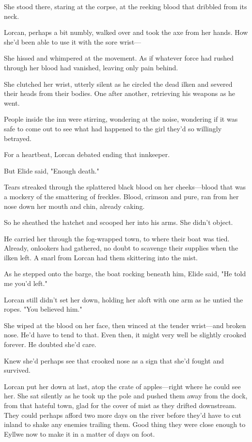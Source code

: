 She stood there, staring at the corpse, at the reeking blood that dribbled from its neck.

Lorcan, perhaps a bit numbly, walked over and took the axe from her hands. How she'd been able to use it with the sore wrist---

She hissed and whimpered at the movement. As if whatever force had rushed through her blood had vanished, leaving only pain behind.

She clutched her wrist, utterly silent as he circled the dead ilken and severed their heads from their bodies. One after another, retrieving his weapons as he went.

People inside the inn were stirring, wondering at the noise, wondering if it was safe to come out to see what had happened to the girl they'd so willingly betrayed.

For a heartbeat, Lorcan debated ending that innkeeper.

But Elide said, "Enough death."

Tears streaked through the splattered black blood on her cheeks---blood that was a mockery of the smattering of freckles. Blood, crimson and pure, ran from her nose down her mouth and chin, already caking.

So he sheathed the hatchet and scooped her into his arms. She didn't object.

He carried her through the fog-wrapped town, to where their boat was tied. Already, onlookers had gathered, no doubt to scavenge their supplies when the ilken left. A snarl from Lorcan had them skittering into the mist.

As he stepped onto the barge, the boat rocking beneath him, Elide said, "He told me you'd left."

Lorcan still didn't set her down, holding her aloft with one arm as he untied the ropes. "You believed him."

She wiped at the blood on her face, then winced at the tender wrist---and broken nose. He'd have to tend to that. Even then, it might very well be slightly crooked forever. He doubted she'd care.

Knew she'd perhaps see that crooked nose as a sign that she'd fought and survived.

Lorcan put her down at last, atop the crate of apples---right where he could see her. She sat silently as he took up the pole and pushed them away from the dock, from that hateful town, glad for the cover of mist as they drifted downstream. They could perhaps afford two more days on the river before they'd have to cut inland to shake any enemies trailing them. Good thing they were close enough to Eyllwe now to make it in a matter of days on foot.

